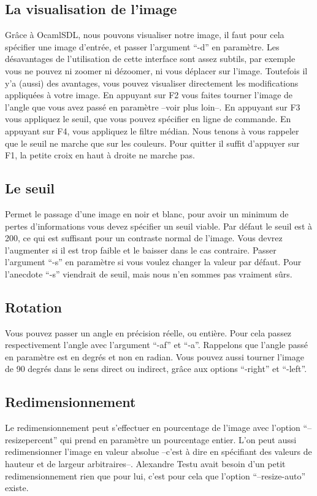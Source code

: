 \documentclass[a4paper,10pt]{report}
\begin{document}
\subsection{ La visualisation de l'image }
 Gr\^ace \`a OcamlSDL, nous pouvons visualiser notre image, il faut pour
 cela sp\'ecifier une image d'entr\'ee, et passer l'argument ``-d'' en
 param\`etre. Les d\'esavantages de l'utilisation de cette interface sont
 assez subtils, par exemple vous ne pouvez ni zoomer ni d\'ezoomer, ni
 vous d\'eplacer sur l'image. Toutefois il y'a (aussi) des avantages, vous pouvez
 visualiser directement les modifications appliqu\'ees \`a votre
 image. En appuyant sur F2 vous faites tourner l'image de l'angle que
 vous avez pass\'e en param\`etre --voir plus loin--. En appuyant sur F3
 vous appliquez le seuil, que vous pouvez sp\'ecifier en ligne de
 commande. En appuyant sur F4, vous appliquez le filtre m\'edian. Nous
 tenons \`a vous rappeler que le seuil ne marche que sur les couleurs.
 Pour quitter il suffit d'appuyer sur F1, la petite croix en haut \`a
 droite ne marche pas.
\subsection{ Le seuil }
 Permet le passage d'une image en noir et blanc, pour avoir un minimum
 de pertes d'informations vous devez sp\'ecifier un seuil viable. Par
 d\'efaut le seuil est \`a 200, ce qui est suffisant pour un contraste
 normal de l'image. Vous devrez l'augmenter si il est trop faible et le
 baisser dans le cas contraire. Passer l'argument ``-s'' en
 param\`etre si vous voulez changer la valeur par d\'efaut. Pour
 l'anecdote ``-s'' viendrait de seuil, mais nous n'en sommes pas vraiment
 s\^urs.
\subsection{ Rotation }
 Vous pouvez passer un angle en pr\'ecision r\'eelle, ou enti\`ere. Pour
 cela passez respectivement l'angle avec l'argument ``-af'' et ``-a''.
 Rappelons que l'angle pass\'e en param\`etre est en degr\'es et non en
 radian. Vous pouvez aussi tourner l'image de 90 degr\'es dans le sens
 direct ou indirect, gr\^ace aux options ``-right'' et ``-left''.
\subsection{ Redimensionnement }
 Le redimensionnement peut s'effectuer en pourcentage de l'image avec
 l'option ``--resizepercent'' qui prend en param\`etre un pourcentage
 entier. L'on peut aussi redimensionner l'image en valeur absolue
 --c'est \`a dire en sp\'ecifiant des valeurs de hauteur et de largeur
 arbitraires--. Alexandre Testu avait besoin d'un petit redimensionnement
 rien que pour lui, c'est pour cela que l'option ``--resize-auto''
 existe.
\end{document}
